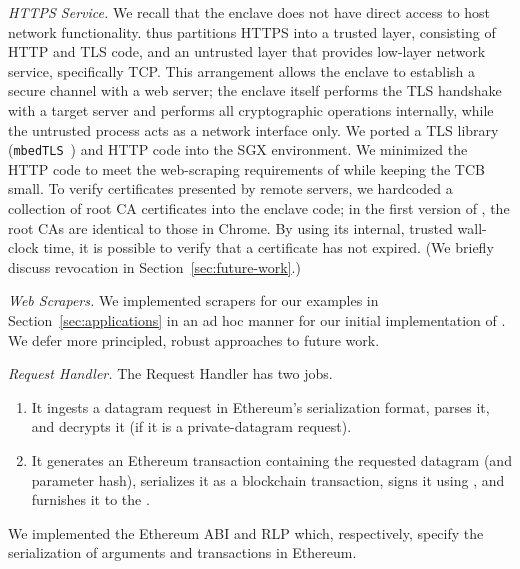 \vspace{2mm}

\noindent\emph{HTTPS Service.} We recall that the enclave does not have direct
access to host network functionality. \tc thus partitions HTTPS into a trusted
layer, consisting of HTTP and TLS code, and an untrusted layer that provides
low-layer network service, specifically TCP.  This arrangement allows the
enclave to establish a secure channel with a web server; the enclave itself
performs the TLS handshake with a target server and performs all cryptographic
operations internally, while the untrusted process acts as a network interface
only. We ported a TLS library (\texttt{mbedTLS}~\cite{mbedtls}) and HTTP code into the SGX environment.
We minimized the HTTP code to meet the web-scraping requirements of \tc while
keeping the TCB small. To verify certificates presented by remote servers, we
hardcoded a collection of root CA certificates into the enclave code; in the
first version of \tc, the root CAs are identical to those in Chrome. By using its internal, trusted wall-clock time, it is possible to verify that a certificate has not expired. (We briefly discuss revocation in Section~\ref{sec:future-work}.)

\vspace{2mm}

\noindent\emph{Web Scrapers.} We implemented scrapers for our examples in Section~\ref{sec:applications} in an ad hoc manner for our initial implementation of \tc.
We defer more principled, robust approaches to future work. 

\vspace{2mm}

\noindent\emph{Request Handler.} The Request Handler has two jobs.
\begin{enumerate}
  \setlength{\itemsep}{2pt}
  \setlength{\parskip}{0pt}
  \setlength{\parsep}{0pt}
  \item It ingests a datagram request in Ethereum's serialization format, parses it, and decrypts it (if it is a private-datagram request).
  \item It generates an Ethereum transaction containing the requested datagram (and parameter hash), serializes it as a blockchain transaction, signs it using \skTC, and furnishes it to the \medname.
\end{enumerate}
We implemented the Ethereum ABI and RLP which, respectively, specify the serialization of arguments and transactions in Ethereum.

\vspace{2mm}


